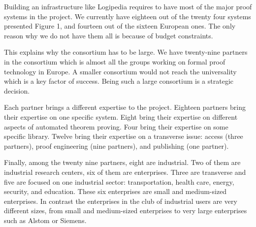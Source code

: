Building an infrastructure like Logipedia requires to have most of the
major proof systems in the project. We currently have eighteen out of
the twenty four systems presented Figure 1, and fourteen out of the
sixteen European ones.  The only reason why we do not have them all is
because of budget constraints.

This explains why the consortium has to be large.  We have twenty-nine
partners in the consortium which is almost all the groups working on
formal proof technology in Europe.  A smaller consortium would not
reach the universality which is a key factor of success.  Being such a
large consortium is a strategic decision.

Each partner brings a different expertise to the project.  Eighteen
partners bring their expertise on one specific system.  Eight bring
their expertise on different aspects of automated theorem
proving. Four bring their expertise on some specific library. Twelve
bring their expertise on a transverse issue: access (three partners),
proof engineering (nine partners), and publishing (one partner).


Finally, among the twenty nine partners, eight are industrial.
Two of them are industrial research centers, six of them are enterprises.
Three are transverse and five are
focused on one industrial sector: transportation, health care, energy,
security, and education. These six enterprises are small and
medium-sized enterprises. In contrast the enterprises in the club of
industrial users are very different sizes, from small and medium-sized
enterprises to very large enterprises such as Alstom or Siemens.


